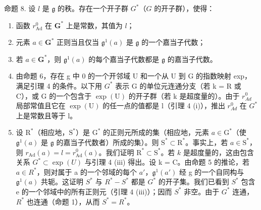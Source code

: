 命题 8. 设 \(l\) 是 \(\mathfrak{g}\) 的秩。存在一个开子群 \(G^*\)（\(G\) 的开子群），使得：

\begin{enumerate}
\def\labelenumi{(\roman{enumi})}
\item
  函数 \(r_{\mathrm{Ad}}^0\) 在 \(\mathbf{G}^*\) 上是常数，其值为 \(l\)；
\item
  元素 \(a \in \mathbf{G}^*\) 正则当且仅当 \(\mathfrak{g}^1(a)\) 是 \(\mathfrak{g}\) 的一个嘉当子代数；
\item
  若 \(a \in \mathbf{G}^*\)，则 \(\mathfrak{g}^1(a)\) 的每个嘉当子代数都是 \(\mathfrak{g}\) 的嘉当子代数。
\item
  由命题 6，存在 g 中 0 的一个开邻域 U 和一个从 U 到 G 的指数映射 exp，满足引理 4 的条件。以下用 \(G^{*}\) 表示 G 的单位元连通分支（若 k = R 或 C），或 G 的一个包含于 \(\exp(\mathrm{U})\) 的开子群（若 k 是超度量的）。由于 \(r_{Ad}^{0}\) 局部常值且它在 \(\exp(\mathrm{U})\) 的任一点的值都是 l（引理 4 (i)），推出 \(r_{Ad}^{0}\) 在 \(G^{*}\) 上是常数且等于 l。
\item
  设 \(\mathrm{R}^*\)（相应地，\(\mathrm{S}^*\)）是 \(\mathrm{G}^*\) 的正则元所成的集（相应地，元素 \(a \in \mathrm{G}^*\)（使 \(\mathfrak{g}^1(a)\) 是 \(\mathfrak{g}\) 的嘉当子代数者）所成的集）。则 \(\mathrm{S}^* \subset \mathrm{R}^*\)。事实上，若 \(a \in \mathrm{S}^*\)，则 \(r_{\mathrm{Ad}}(a) = l = r_{\mathrm{Ad}}^0(a)\)。我们证明 \(\mathrm{R}^* \subset \mathrm{S}^*\)。若 \(k\) 是超度量的，这由包含关系 \(G^{*} \subset \exp(U)\) 与引理 4 (iii) 得出。设 k = C。由命题 5 的推论，若 \(a \in R^{*}\)，则对属于 a 的一个邻域的每个 \(a'\)，\(\mathfrak{g}^{1}(a')\) 经 g 的一个自同构与 \(\mathfrak{g}^{1}(a)\) 共轭。这证明 \(S^{*}\) 与 \(R^{*} - S^{*}\) 都是 \(G^{*}\) 的开子集。我们已看到 \(S^{*}\) 包含 e 的一个邻域中的所有正则元（引理 4 (iii)）；因而 \(S^{*}\) 非空。由于 \(G^{*}\) 连通，\(R^{*}\) 也连通（命题 1），从而 \(S^{*} = R^{*}\)。
\end{enumerate}

